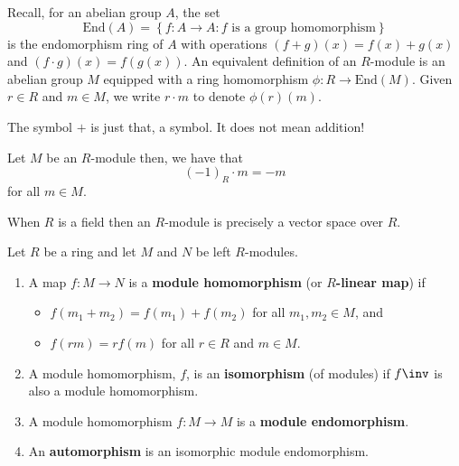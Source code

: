 \documentclass[12pt, a4paper]{article}
\begin{document}
\begin{mdremark}
    Recall, for an abelian group \(A\), the set 
    \[\text{End}(A)=\left\{ f:A \to A : f \text{ is a group homomorphism} \right\}\]
    is the endomorphism ring of \(A\) with operations \((f+g)(x)=f(x)+g(x)\) and \((f\cdot g)(x)=f(g(x))\).
    An equivalent definition of an \(R\)-module is an abelian group \(M\) equipped with a ring homomorphism \(\phi:R \to \text{End}(M)\). Given \(r\in R\) and \(m \in M\), we write \(r\cdot m\) to denote \(\phi(r)(m)\). 
\end{mdremark}

\begin{mdremark} 
    The symbol \(+\) is just that, a symbol. It does not mean addition!
\end{mdremark}

\begin{mdprop}
    Let \(M\) be an \(R\)-module then, we have that
    \[(-1)_R \cdot m=-m\]
    for all \(m \in M\).
\end{mdprop}

\begin{mdexample}
    When \(R\) is a field then an \(R\)-module is precisely a vector space over \(R\).
\end{mdexample}

\begin{definition}
    Let \(R\) be a ring and let \(M\) and \(N\) be left \(R\)-modules. 
    \begin{enumerate}
        \item A map \(f : M \to N\) is a \textbf{module homomorphism} (or \textbf{\(R\)-linear map}) if 
        \begin{itemize}
            \item \(f(m_1+m_2)=f(m_1)+f(m_2)\) for all \(m_1,m_2 \in M\), and 
            \item \(f(rm)=rf(m)\) for all \(r \in R\) and \(m \in M\).
        \end{itemize}
        \item A module homomorphism, \(f\), is an \textbf{isomorphism} (of modules) if \(f\inv\) is also a module homomorphism.
        \item A module homomorphism \(f : M \to M\) is a \textbf{module endomorphism}.
        \item An \textbf{automorphism} is an isomorphic module endomorphism.
    \end{enumerate}
\end{definition}
\end{document}
